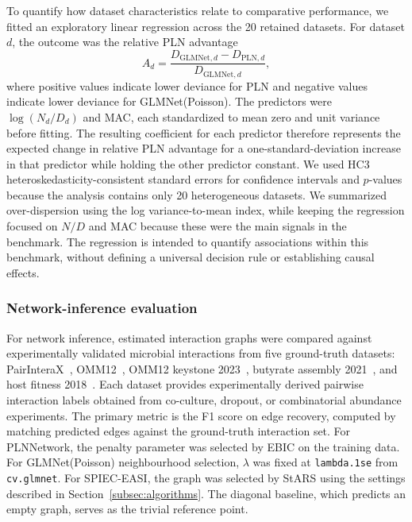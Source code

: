 \documentclass[USenglish]{article}
\theoremstyle{dgthm}
\begin{document}
To quantify how dataset characteristics relate to comparative performance, we fitted an exploratory linear regression across the 20 retained datasets.
For dataset $d$, the outcome was the relative PLN advantage
\[
A_d = \frac{D_{\mathrm{GLMNet},d}-D_{\mathrm{PLN},d}}
{D_{\mathrm{GLMNet},d}},
\]
where positive values indicate lower deviance for PLN and negative values indicate lower deviance for GLMNet(Poisson).
The predictors were $\log(N_d/D_d)$ and MAC, each standardized to mean zero and unit variance before fitting.
The resulting coefficient for each predictor therefore represents the expected change in relative PLN advantage for a one-standard-deviation increase in that predictor while holding the other predictor constant.
We used HC3 heteroskedasticity-consistent standard errors for confidence intervals and $p$-values because the analysis contains only 20 heterogeneous datasets.
We summarized over-dispersion using the log variance-to-mean index, while keeping the regression focused on $N/D$ and MAC because these were the main signals in the benchmark.
The regression is intended to quantify associations within this benchmark, without defining a universal decision rule or establishing causal effects.

\subsubsection{Network-inference evaluation}

For network inference, estimated interaction graphs were compared against experimentally validated microbial interactions from five ground-truth datasets: PairInteraX~\citep{Zhu2025PairInteraX}, OMM12~\citep{Weiss2022OMM12}, OMM12 keystone 2023~\citep{Weiss2023Keystone}, butyrate assembly 2021~\citep{Clark2021Butyrate}, and host fitness 2018~\citep{Gould2018HostFitness}.
Each dataset provides experimentally derived pairwise interaction labels obtained from co-culture, dropout, or combinatorial abundance experiments.
The primary metric is the F1 score on edge recovery, computed by matching predicted edges against the ground-truth interaction set.
For PLNNetwork, the penalty parameter was selected by EBIC on the training data.
For GLMNet(Poisson) neighbourhood selection, $\lambda$ was fixed at \texttt{lambda.1se} from \texttt{cv.glmnet}.
For SPIEC-EASI, the graph was selected by StARS using the settings described in Section~\ref{subsec:algorithms}.
The diagonal baseline, which predicts an empty graph, serves as the trivial reference point.
\end{document}
